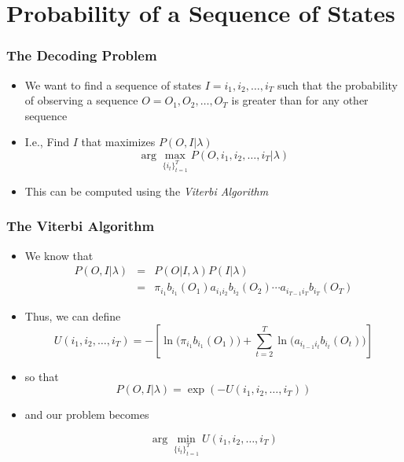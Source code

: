 \documentclass{beamer}
\begin{document}

\section{Probability of a Sequence of States}

\begin{frame} \frametitle{The Decoding Problem}

  \begin{itemize}
  \item We want to find a sequence of states $I = i_1, i_2, \dotsc, i_T$ such
    that the probability of observing a sequence $O = O_1, O_2, \dotsc, O_T$ is
    greater than for any other sequence
  \item I.e., Find $I$ that maximizes $P(O,I|\lambda)$
    \begin{displaymath}
      \arg \max_{\{i_t\}_{t=1}^T} P(O,i_1, i_2, \dotsc, i_T|\lambda)
    \end{displaymath}
  \item This can be computed using the \emph{Viterbi Algorithm}
  \end{itemize}
  
\end{frame}


\begin{frame} \frametitle{The Viterbi Algorithm}

  \begin{itemize}
  \item We know that
    \begin{eqnarray*}
      P(O,I|\lambda) & = & P(O|I,\lambda)P(I|\lambda) \\
                     & = & \pi_{i_1}b_{i_1}(O_1)a_{i_1i_2}b_{i_2}(O_2) \dotsb a_{i_{T-1}i_T}b_{i_T}(O_T)
    \end{eqnarray*}
  \item Thus, we can define
    \begin{displaymath}
      U(i_1, i_2, \dotsc, i_T) = 
        - \left[ \ln\big(\pi_{i_1}b_{i_1}(O_1)\big) +
                 \sum_{t=2}^T \ln\big(a_{i_{t-1}i_t}b_{i_t}(O_t)\big)
         \right]
    \end{displaymath}
  \item so that
    \begin{displaymath}
      P(O,I|\lambda) = \exp(-U(i_1, i_2, \dotsc, i_T))
    \end{displaymath}
  \item and our problem becomes
    \begin{block}{}
      \begin{displaymath}
        \arg \min_{\{i_t\}_{t=1}^T} U(i_1, i_2, \dotsc, i_T)
      \end{displaymath}
    \end{block}
  \end{itemize}
  
\end{frame}
\end{document}
